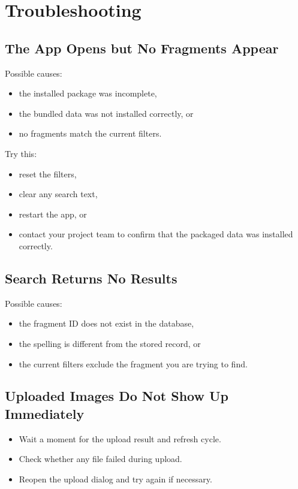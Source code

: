 \documentclass[12pt]{article}
\begin{document}
\section{Troubleshooting}

\subsection{The App Opens but No Fragments Appear}
Possible causes:
\begin{itemize}
  \item the installed package was incomplete,
  \item the bundled data was not installed correctly, or
  \item no fragments match the current filters.
\end{itemize}

Try this:
\begin{itemize}
  \item reset the filters,
  \item clear any search text,
  \item restart the app, or
  \item contact your project team to confirm that the packaged data was installed correctly.
\end{itemize}

\subsection{Search Returns No Results}
Possible causes:
\begin{itemize}
  \item the fragment ID does not exist in the database,
  \item the spelling is different from the stored record, or
  \item the current filters exclude the fragment you are trying to find.
\end{itemize}

\subsection{Uploaded Images Do Not Show Up Immediately}
\begin{itemize}
  \item Wait a moment for the upload result and refresh cycle.
  \item Check whether any file failed during upload.
  \item Reopen the upload dialog and try again if necessary.
\end{itemize}
\end{document}
